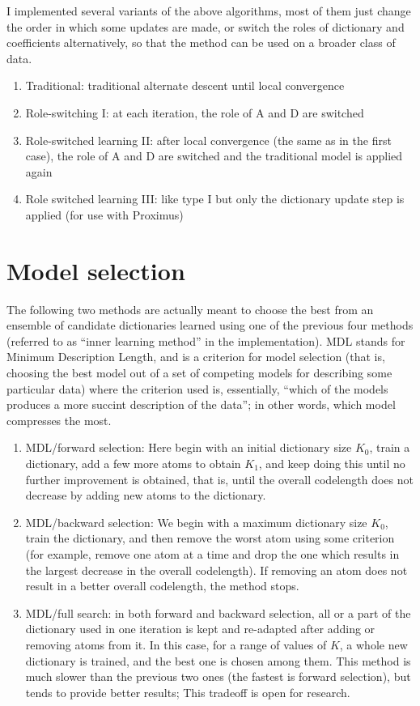 \documentclass[a4paper]{IEEEtran}
\begin{document}
I implemented several variants of the above algorithms, most of them just change the order in which some updates are made, or switch the roles of dictionary and coefficients alternatively, so that the method can be used on a broader class of data.
 

\begin{enumerate}
\item Traditional: traditional alternate descent until local convergence
\item Role-switching I: at each iteration, the role of A and D are switched
\item Role-switched learning II: after local convergence (the same as in the first case), the role of A and D are switched and the traditional model is applied again
\item Role switched learning III: like type I but only the dictionary update step is applied (for use with Proximus)
\end{enumerate}

\section{Model selection}

The following two methods are actually meant to choose the best from an ensemble of candidate dictionaries learned using one of the previous four methods (referred to as ``inner learning method'' in the implementation). MDL stands for Minimum Description Length, and is a criterion for model selection (that is, choosing the best model out of a set of competing models for describing some particular data) where the criterion used is, essentially, ``which of the models produces a more succint description of the data''; in other words, which model compresses the most.
 
\begin{enumerate}
\item MDL/forward selection:  Here begin with an initial dictionary size $K_0$, train a dictionary, add a few more atoms to obtain $K_1$, and keep doing this until no further improvement is obtained, that is, until the overall codelength does not decrease by adding new atoms to the dictionary.
 
\item MDL/backward selection: We begin with a maximum dictionary size $K_0$, train the dictionary, and then remove the worst atom using some criterion (for example, remove one atom at a time and drop the one  which results in the largest decrease in the overall codelength). If removing an atom does not result in a better overall codelength, the method stops. 

\item MDL/full search: in both forward and backward selection, all or a part of the dictionary used in one iteration is kept and re-adapted after adding or removing atoms from it. In this case, for a range of values of $K$, a whole new dictionary is trained, and the best one is chosen among them. This method is much slower than the previous two ones (the fastest is forward selection), but tends to provide better results; This tradeoff is open for research.

\end{enumerate}
\end{document}
